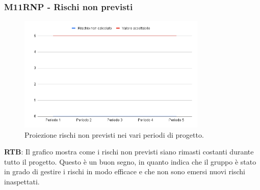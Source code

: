 \subsubsection{M11RNP - Rischi non previsti}
\begin{figure}[H]
    \centering
    \includegraphics[width=0.8\textwidth]{../Images/PianoDiQualifica/M11RNP.png}
    \caption{Proiezione rischi non previsti nei vari periodi di progetto.}
    \label{fig:6}
\end{figure}

\textbf{RTB}: Il grafico mostra come i rischi non previsti siano rimasti costanti durante tutto il progetto. Questo è un buon segno, in quanto indica che il gruppo è stato in grado di gestire i rischi in modo efficace e che non sono emersi nuovi rischi inaspettati.